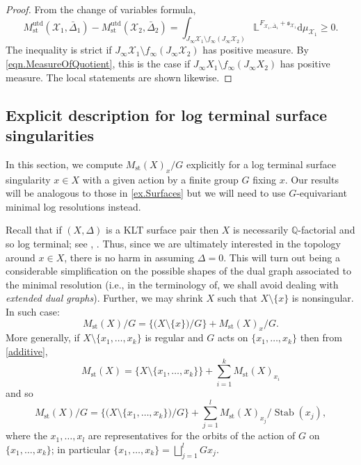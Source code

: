 \documentclass[12pt]{amsart}
\theoremstyle{plain}   %
\theoremstyle{definition}    %
\theoremstyle{remark}    %
\numberwithin{equation}{theorem}
\DeclareMathOperator{\Stab}{{Stab}}
\DeclareMathOperator{\st}{\mathrm{st}}
\DeclareMathOperator{\utd}{\mathrm{utd}}
\newcommand{\sX}{\mathcal{X}}
\newcommand{\bL}{\mathbb{L}}
\newcommand{\bQ}{\mathbb{Q}}
\begin{document}
\begin{proof}
From the change of variables formula,
\[
M_{\st}^{\utd}(\sX_1,\bar{\Delta}_1)
-
M_{\st}^{\utd}(\sX_2,\bar{\Delta}_2)
= \int_{J_\infty \sX_1 \setminus f_\infty(J_\infty  \sX_2)}\bL^{F_{\sX_1,\bar{\Delta}_1} +\mathfrak{s}_{\sX_1}}\mathrm{d}\mu_{\sX_1}\ge 0.
\]
The inequality is strict if $J_\infty \sX_1 \setminus f_\infty(J_\infty  \sX_2)$ has positive measure. By \autoref{eqn.MeasureOfQuotient}, this is the case if $J_\infty X_1 \setminus f_\infty (J_\infty X_2)$ has positive measure. The local statements are shown likewise. 
\end{proof}
\subsection{Explicit description for log terminal surface singularities} \label{sec.ExplicitDescriptionSurfaceCase}

In this section, we compute $M_{\st}(X)_x/G$ explicitly for a log terminal surface singularity $x\in X$ with a given action by a finite group $G$ fixing $x$. Our results will be analogous to those in \autoref{ex.Surfaces} but we will need to use $G$-equivariant minimal log resolutions instead. 

Recall that if $(X,\Delta)$ is a KLT surface pair then $X$ is necessarily $\bQ$-factorial and so log terminal; see \cite[Corollary 4.11]{TanakaMMPExcellentSurfaces}, \cite[Corollary 2.35]{KollarMori}. Thus, since we are ultimately interested in the topology around $x \in X$, there is no harm in assuming $\Delta = 0$. This will turn out being a considerable simplification on the possible shapes of the dual graph associated to the minimal resolution (i.e., in the terminology of\cite[\S 2.2]{KollarSingulaitieofMMP}, we shall avoid dealing with \emph{extended dual graphs}). Further, we may shrink $X$ such that $X\setminus \{x\}$ is nonsingular. In such case:
\begin{equation} \label{eqn.GlobalvsLocalSurfaceCase}
M_{\st}(X)/G = \big\{\big(X \setminus \{x\}\big)/G \big\} + M_{\st}(X)_x/G. 
\end{equation}
More generally, if $X \setminus \{x_1,\ldots, x_k\}$ is regular and $G$ acts on $\{x_1, \ldots, x_k\}$ then from \autoref{additive},
\[
M_{\st}(X)= \bigl\{X\setminus \{x_1,\ldots, x_k\}\bigr\} + \sum_{i=1}^k M_{\st}(X)_{x_i}
\]
and so
\begin{equation} \label{eqn.GlobalvsLocalSurfaceCaseManyPoints}
M_{\st}(X)/G= \bigl\{\bigl(X\setminus \{x_1,\ldots, x_k\}\bigr)/G\bigr\} + \sum_{j=1}^l M_{\st}(X)_{x_j}/\Stab(x_j), 
\end{equation}
where the $x_1, \ldots, x_l$ are representatives for the orbits of the action of $G$ on $\{x_1, \ldots, x_k\}$; in particular $\{x_1,\ldots, x_k\} = \bigsqcup_{j=1}^l  G x_j$.
\end{document}
